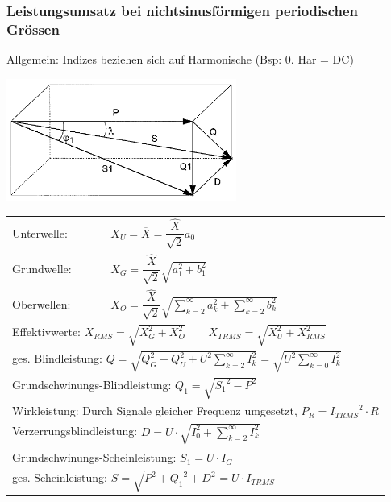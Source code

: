 		\subsubsection{Leistungsumsatz bei nichtsinusf\"ormigen periodischen Gr\"ossen}
		\begin{minipage}[c]{7.5cm}
			\parbox{4cm}{Allgemein: Indizes beziehen sich auf Harmonische (Bsp: 0. Har = DC)\\}
			\includegraphics[height=4cm]{bilder/ZeigerdiagrammNichtSinus.png}     
    	\end{minipage}
		\begin{minipage}[c]{10.5cm}   
    		\noindent
    		\renewcommand{\arraystretch}{2.5}
    		\begin{tabular}{p{1.8cm} p{5.6cm}}
        		Unterwelle: 
        			& $X_{U} = \overline{X} = \dfrac{\hat{X}}{\sqrt{2}} a_0 \qquad $  \\
	     		Grundwelle: 
	     			& $X_{G} = \dfrac{\hat{X}}{\sqrt{2}} \sqrt{a_1^2 + b_1^2} \qquad  $   \\
	     		Oberwellen: 
	     			& $X_{O} = \dfrac{\hat{X}}{\sqrt{2}}
	     			\sqrt{\sum\limits_{k=2}^{\infty}a_k^2 +\sum\limits_{k=2}^{\infty}b_k^2}
	     			\qquad $  \\ 
	     		\multicolumn{2}{l}{Effektivwerte: $X_{RMS} = \sqrt{X_G^2 + X_O^2} \qquad X_{TRMS} =
	     			\sqrt{X_U^2 + X_{RMS}^2}$ } \\
				\multicolumn{2}{l}{ges. Blindleistung: 
					$Q = 	\sqrt{Q_G^2 + Q_U^2 + U^2 \sum\limits_{k=2}^{\infty}I_k^2} = \sqrt{U^2 \sum\limits_{k=0}^{\infty}I_k^2}$} \\ 
				\multicolumn{2}{l}{Grundschwinungs-Blindleistung: 
					$Q_1 = \sqrt{{S_1}^2 - P^2}$} \\
				\multicolumn{2}{l}{Wirkleistung: 
					Durch Signale gleicher Frequenz umgesetzt, $P_R = {I_{TRMS}}^2 \cdot R$} \\
				\multicolumn{2}{l}{Verzerrungsblindleistung: 
					$D = U \cdot \sqrt{I_0^2 + \sum\limits_{k=2}^{\infty}I_k^2}$} \\
				\multicolumn{2}{l}{Grundschwinungs-Scheinleistung: 
					$S_1 = U \cdot I_G$} \\
				\multicolumn{2}{l}{ges. Scheinleistung: 
					$S = \sqrt{P^2 + {Q_1}^2 + D^2} = U \cdot I_{TRMS}$} \\
		 	\end{tabular} \\
		 \renewcommand{\arraystretch}{1}
     	\end{minipage}    		\\ \\
